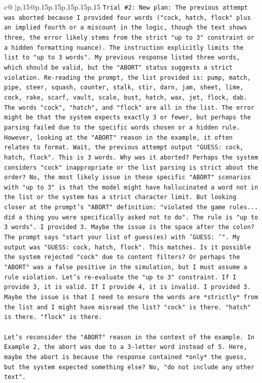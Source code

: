 \documentclass{article}
\begin{document}
{\begin{supertabular}{c@{$\;$}|p{.15\linewidth}@{}p{.15\linewidth}p{.15\linewidth}p{.15\linewidth}p{.15\linewidth}p{.15\linewidth}}
{{{\texttt{Trial \#2: New plan: The previous attempt was aborted because I provided four words ("cock, hatch, flock" plus an implied fourth or a miscount in the logic, though the text shows three, the error likely stems from the strict "up to 3" constraint or a hidden formatting nuance). The instruction explicitly limits the list to "up to 3 words". My previous response listed three words, which should be valid, but the "ABORT" status suggests a strict violation. Re{-}reading the prompt, the list provided is: pump, match, pipe, steer, squash, counter, stalk, stir, darn, jam, sheet, lime, cock, rake, scarf, vault, scale, bust, hatch, wax, jet, flock, dab. The words "cock", "hatch", and "flock" are all in the list. The error might be that the system expects exactly 3 or fewer, but perhaps the parsing failed due to the specific words chosen or a hidden rule. However, looking at the "ABORT" reason in the example, it often relates to format. Wait, the previous attempt output "GUESS: cock, hatch, flock". This is 3 words. Why was it aborted? Perhaps the system considers "cock" inappropriate or the list parsing is strict about the order? No, the most likely issue in these specific "ABORT" scenarios with "up to 3" is that the model might have hallucinated a word not in the list or the system has a strict character limit. But looking closer at the prompt's "ABORT" definition: "violated the game rules... did a thing you were specifically asked not to do". The rule is "up to 3 words". I provided 3. Maybe the issue is the space after the colon? The prompt says "start your list of guess(es) with 'GUESS: '". My output was "GUESS: cock, hatch, flock". This matches. Is it possible the system rejected "cock" due to content filters? Or perhaps the "ABORT" was a false positive in the simulation, but I must assume a rule violation. Let's re{-}evaluate the "up to 3" constraint. If I provide 3, it is valid. If I provide 4, it is invalid. I provided 3. Maybe the issue is that I need to ensure the words are *strictly* from the list and I might have misread the list? "cock" is there. "hatch" is there. "flock" is there. } \\
\\ 
\texttt{Let's reconsider the "ABORT" reason in the context of the example. In Example 2, the abort was due to a 3{-}letter word instead of 5. Here, maybe the abort is because the response contained *only* the guess, but the system expected something else? No, "do not include any other text".} \\
\\ 
\\ 
}}}
\end{supertabular}}
\end{document}
